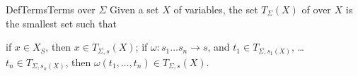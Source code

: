 {DefTerms}{Terms over $\Sigma$}{}
Given a set $X$ of variables, the set $T_\Sigma(X)$ of
 over $X$ is the smallest set such that 
\begin{List}[Label=TermFormationRules,ListType=itemize]
  \ListItem
  if $x\in X_S$, then $x\in T_{\Sigma, s}(X)$;
  \ListItem
  if $\omega:s_1\ldots s_n\rightarrow s$, and
  $t_1\in T_{\Sigma,{s_1}(X)}$, \ldots
  $t_n\in T_{\Sigma,{s_n}(X)}$, then 
  $\omega(t_1,\ldots, t_n)\in T_{\Sigma,s}(X)$.
\end{List}
